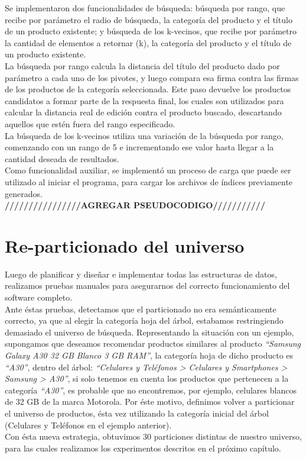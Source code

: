 Se implementaron dos funcionalidades de b\'usqueda: b\'usqueda por rango, que recibe por par\'ametro el radio de b\'usqueda, la categor\'ia del producto y el t\'itulo de un producto existente; y b\'usqueda de los k-vecinos, que recibe por par\'ametro la cantidad de elementos a retornar (k), la categor\'ia del producto y el t\'itulo de un producto existente.\\

La b\'usqueda por rango calcula la distancia del t\'itulo del producto dado por par\'ametro a cada uno de los pivotes, y luego compara esa firma contra las firmas de los productos de la categor\'ia seleccionada. Este paso devuelve los productos candidatos a formar parte de la respuesta final, los cuales son utilizados para calcular la distancia real de edici\'on contra el producto buscado, descartando aquellos que est\'en fuera del rango especificado.\\

La b\'usqueda de los k-vecinos utiliza una variaci\'on de la b\'usqueda por rango, comenzando con un rango de 5 e incrementando ese valor hasta llegar a la cantidad deseada de resultados.\\

Como funcionalidad auxiliar, se implement\'o un proceso de carga que puede ser utilizado al iniciar el programa, para cargar los archivos de \'indices previamente generados.\\





\textbf{////////////////AGREGAR PSEUDOCODIGO///////////}






\section{Re-particionado del universo}

Luego de planificar y diseñar e implementar todas las estructuras de datos, realizamos pruebas manuales para asegurarnos del correcto funcionamiento del software completo.\\

Ante \'estas pruebas, detectamos que el particionado no era sem\'anticamente correcto, ya que al elegir la categor\'ia hoja del \'arbol, estabamos restringiendo demasiado el universo de b\'usqueda. Representando la situaci\'on con un ejemplo, supongamos que deseamos recomendar productos similares al producto \textit{“Samsung Galaxy A30 32 GB Blanco 3 GB RAM”}, la categor\'ia hoja de dicho producto es \textit{“A30”}, dentro del \'arbol: \textit{“Celulares y Tel\'efonos > Celulares y Smartphones > Samsung > A30”}, si solo tenemos en cuenta los productos que pertenecen a la categor\'ia \textit{“A30”}, es probable que no encontremos, por ejemplo, celulares blancos de 32 GB de la marca Motorola.
Por \'este motivo, definimos volver a particionar el universo de productos, \'esta vez utilizando la categor\'ia inicial del \'arbol (Celulares y Tel\'efonos en el ejemplo anterior).\\

Con \'esta nueva estrategia, obtuvimos 30 particiones distintas de nuestro universo, para las cuales realizamos los experimentos descritos en el pr\'oximo cap\'itulo.
